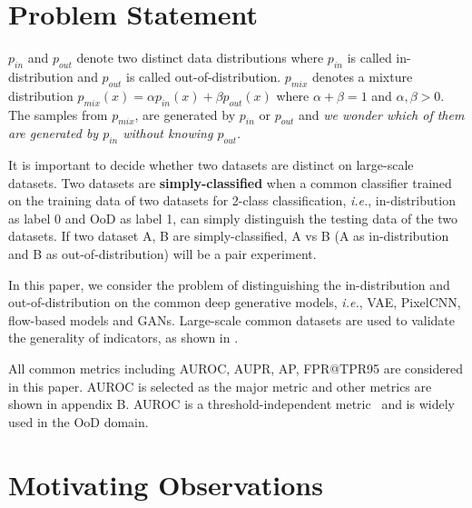 \documentclass[letterpaper]{article} %
\newcommand{\IE}{\textit{i.e.}, }
\newcommand{\pin}{p_{in}}
\newcommand{\pout}{p_{out}}
\newcommand{\pmix}{p_{mix}}
\begin{document}
\section{Problem Statement}\label{sec2}

$\pin$ and $\pout$ denote two distinct data distributions where $\pin$ is called in-distribution and $\pout$ is called out-of-distribution. 
$\pmix$ denotes a mixture distribution $\pmix(x) = \alpha \pin(x) + \beta \pout(x)$ where $\alpha + \beta = 1$ and $\alpha, \beta > 0$. 
The samples from $\pmix$, are generated by $\pin$ or $\pout$ and \textit{we wonder which of them are generated by $\pin$ without knowing $\pout$}. 

It is important to decide whether two datasets are distinct on large-scale datasets. Two datasets are \textbf{simply-classified} when a common classifier trained on the training data of two datasets for 2-class classification, \IE in-distribution as label 0 and OoD as label 1, can simply distinguish the testing data of the two datasets. If two dataset A, B are simply-classified, A vs B (A as in-distribution and B as out-of-distribution) will be a pair experiment. 

In this paper, we consider the problem of distinguishing the in-distribution and out-of-distribution on the common deep generative models, \IE VAE, PixelCNN, flow-based models and GANs. Large-scale common datasets are used to validate the generality of indicators, as shown in . 

All common metrics including AUROC, AUPR, AP, FPR@TPR95 are considered in this paper. AUROC is selected as the major metric and other metrics are shown in appendix B. AUROC is a threshold-independent metric~\cite{davis2006relationship} and is widely used in the OoD domain. %

\section{Motivating Observations}\label{sec3}
\end{document}
